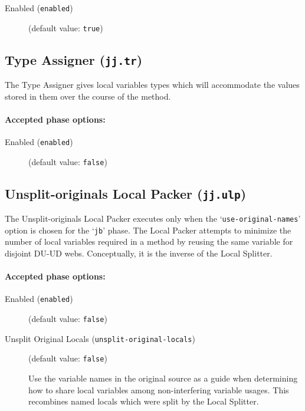 \documentclass{article}
\begin{document}
\begin{description}

\item[Enabled ({\tt enabled})]
(default value: {\tt true})






\end{description}

\subsection{Type Assigner ({\tt jj.tr})}

The Type Assigner gives local variables types which will
accommodate the values stored in them over the course of the
method.


\paragraph{Accepted phase options:} 

\begin{description}

\item[Enabled ({\tt enabled})]
(default value: {\tt false})






\end{description}

\subsection{Unsplit-originals Local Packer ({\tt jj.ulp})}

The Unsplit-originals Local Packer executes only when the
`{\tt use-original-names}' option is chosen for the
`{\tt jb}' phase.  The Local Packer attempts to minimize
the number of local variables required in a method by reusing the
same variable for disjoint DU-UD webs. Conceptually, it is the
inverse of the Local Splitter.


\paragraph{Accepted phase options:} 

\begin{description}

\item[Enabled ({\tt enabled})]
(default value: {\tt false})






\item[Unsplit Original Locals ({\tt unsplit-original-locals})]
(default value: {\tt false})




Use the variable names in the original source as a guide when
determining how to share local variables among non-interfering
variable usages. This recombines named locals which were split by
the Local Splitter.



\end{description}
\end{document}
